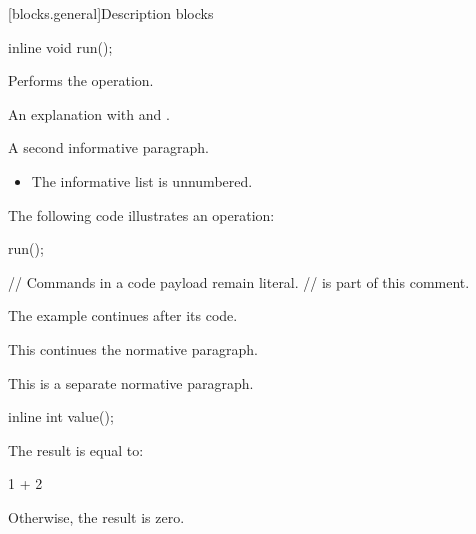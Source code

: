 [blocks.general]{Description blocks}

%
\begin{itemdecl}
inline void run();
\end{itemdecl}

\begin{itemdescr}
\pnum
\effects
Performs the operation.
\begin{note}
An explanation with  and .

A second informative paragraph.

\begin{itemize}
\item The informative list is unnumbered.
\end{itemize}
\end{note}
\begin{example}
The following code illustrates an operation:

\begin{codeblock}
  run();

// Commands in a code payload remain literal.
// \effects is part of this comment.
\end{codeblock}

The example continues after its code.
\end{example}
This continues the normative paragraph.

\pnum
This is a separate normative paragraph.
\end{itemdescr}

%
\begin{itemdecl}
inline int value();
\end{itemdecl}

\begin{itemdescr}
\pnum
The result is equal to:
\begin{codeblock}
1 + 2
\end{codeblock}
Otherwise, the result is zero.
\end{itemdescr}
